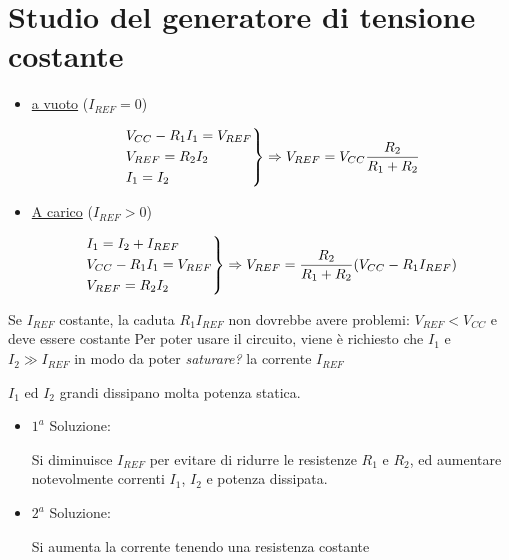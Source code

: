 \documentclass{article}
\begin{document}
\section{Studio del generatore di tensione costante}
\begin{minipage}{0.3\textwidth}
\end{minipage}
\begin{minipage}{0.7\textwidth}
    \begin{itemize}
        \item \underline{a vuoto} ($I_{REF} = 0$)

            \[
            \begin{rcases}
                V_{CC} - R_1 I_1 = V_{REF}\\
                V_{REF} = R_2 I_2\\
                I_1 = I_2
            \end{rcases} \Rightarrow V_{REF} = V_{CC} \frac{R_2}{R_1 + R_2}
            \]
        \item \underline{A carico} ($I_{REF} > 0$)

            \[
                \begin{rcases}
                    I_1 = I_2 + I_{REF}\\
                    V_{CC} - R_1 I_1 = V_{REF}\\
                    V_{REF} = R_2 I_2
                \end{rcases} \Rightarrow V_{REF} = \frac{R_2}{R_1 + R_2} (V_{CC} - R_1 I_{REF})
            \]
    \end{itemize}

    Se $I_{REF}$ costante, la caduta $R_1 I_{REF}$ non dovrebbe avere problemi: $V_{REF} < V_{CC}$ e deve essere costante
    Per poter usare il circuito, viene è richiesto che $I_1$ e $I_2 \gg I_{REF}$ in modo da poter \textit{saturare?} la corrente $I_{REF}$

    $I_1$ ed $I_2$ grandi dissipano molta potenza statica.
\end{minipage}

\begin{itemize}
    \item $1^a$ Soluzione:

        Si diminuisce $I_{REF}$ per evitare di ridurre le resistenze $R_1$ e $R_2$, ed aumentare notevolmente correnti $I_1$, $I_2$ e potenza dissipata.

    \item $2^a$ Soluzione:

    Si aumenta la corrente tenendo una resistenza costante

\end{itemize}
\end{document}
